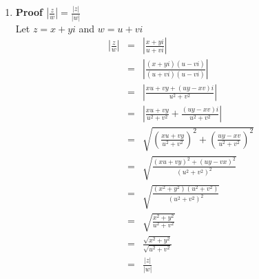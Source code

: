\documentclass{article}%
\newcommand\abs[1]{\left|#1\right|}
\newenvironment{proof}[1][]{\begin{samepage}\textbf{Proof #1} }{\end{samepage}}
\begin{document}
\begin{enumerate}
\begin{enumerate}[label*=\arabic*.]
\begin{enumerate}[label=\alph*]
\begin{proof}[$\overline{\frac{z}{w}}=\frac{\bar{z}}{\bar{w}}$]
\begin{eqnarray*}
                                            &=&\overline{(\frac{xu+yv+(uy-xv)i}{u^2+v^2})} \\
                                            &=&\frac{xu+yv-(uy-xv)i}{u^2+v^2} \\
                    \frac{\bar{z}}{\bar{w}}&=&\frac{\overline{x+yi}}{\overline{u+vi}} \\
                                           &=&\frac{x-yi}{u-vi} \\
                                           &=&\frac{(x-yi)(u+vi)}{(u-vi)(u+vi)} \\
                                           &=&\frac{xu+yv-(uy-xv)i}{u^2+v^2} \\ 
                    \overline{(\frac{z}{w})}&=&\frac{\bar{z}}{\bar{w}}
                \end{eqnarray*}
            \end{proof}
            \item %
            \begin{proof}[$\abs{\frac{z}{w}}=\frac{\abs{z}}{\abs{w}}$]
                \\ Let $z=x+yi$ and $w=u+vi$
                \begin{eqnarray*}
                    \abs{\frac{z}{w}}&=&\abs{\frac{x+yi}{u+vi}} \\
                                     &=&\abs{\frac{(x+yi)(u-vi)}{(u+vi)(u-vi)}} \\
                                     &=&\abs{\frac{xu+vy+(uy-xv)i}{u^2+v^2}} \\
                                     &=&\abs{\frac{xu+vy}{u^2+v^2}+\frac{(uy-xv)i}{u^2+v^2}} \\
                                     &=&\sqrt{(\frac{xu+vy}{u^2+v^2})^2 + (\frac{uy-xv}{u^2+v^2})^2 } \\
                                     &=&\sqrt{\frac{(xu+vy)^2+(uy-vx)^2}{(u^2+v^2)^2}} \\
                                     &=&\sqrt{\frac{(x^2+y^2)(u^2+v^2)}{(u^2+v^2)^2}} \\
                                     &=&\sqrt{\frac{x^2+y^2}{u^2+v^2}} \\
                                     &=&\frac{\sqrt{x^2+y^2}}{\sqrt{u^2+v^2}} \\
                                     &=&\frac{\abs{z}}{\abs{w}}
                \end{eqnarray*}
            \end{proof}

\end{enumerate}
\end{enumerate}
\end{enumerate}
\end{document}
